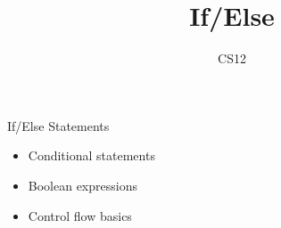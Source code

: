 \documentclass{beamer}
\title{If/Else}
\author{CS12}
\date{}
\begin{document}
\begin{frame}
    \titlepage
\end{frame}

\begin{frame}{If/Else Statements}
    \begin{itemize}
        \item Conditional statements
        \item Boolean expressions
        \item Control flow basics
    \end{itemize}
\end{frame}
\end{document}
